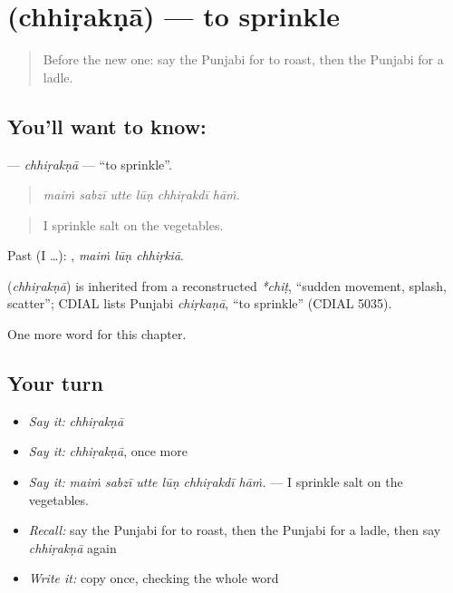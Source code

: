 \section[\texorpdfstring{\pa{ਛਿੜਕਣਾ} (chhiṛakṇā)}{ਛਿੜਕਣਾ (chhiṛakṇā)}]{ (chhiṛakṇā) — to sprinkle}

\label{lesson:PA-C242-chhirakna}



\begin{quote}
Before the new one: say the Punjabi for to roast, then the Punjabi for a ladle.
\end{quote}

\subsection*{You'll want to know: }
\textbf{} — \emph{chhiṛakṇā} — \textquotedblleft{}to sprinkle\textquotedblright{}.

\begin{quote}
     
\end{quote}

\begin{quote}
\emph{maiṁ sabzī utte lūṇ chhiṛakdī hāṁ.}
\end{quote}

\begin{quote}
I sprinkle salt on the vegetables.
\end{quote}

Past (I …):   , \emph{maiṁ lūṇ chhiṛkiā}.

\begin{cousinweb}
\textbf{} (\emph{chhiṛakṇā}) is inherited from a reconstructed \emph{*chiṭ}, \textquotedblleft{}sudden movement, splash, scatter\textquotedblright{}; CDIAL lists Punjabi \emph{chiṛkaṇā}, \textquotedblleft{}to sprinkle\textquotedblright{} (CDIAL 5035).
\end{cousinweb}

\begin{grammarlens}[title={What you've built}]
One more word for this chapter.
\end{grammarlens}

\subsection*{Your turn}
\begin{itemize}
\raggedright
  \item \emph{Say it:} \emph{chhiṛakṇā}
  \item \emph{Say it:} \emph{chhiṛakṇā}, once more
  \item \emph{Say it:} \emph{maiṁ sabzī utte lūṇ chhiṛakdī hāṁ.} — I sprinkle salt on the vegetables.
  \item \emph{Recall:} say the Punjabi for to roast, then the Punjabi for a ladle, then say \emph{chhiṛakṇā} again
  \item \emph{Write it:} copy \textbf{} once, checking the whole word
\end{itemize}

